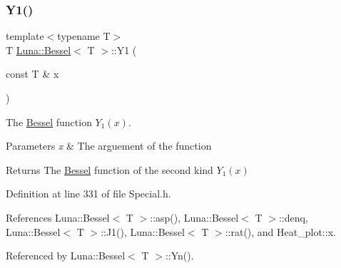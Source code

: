 \subsubsection{\texorpdfstring{Y1()}{Y1()}}
{\footnotesize\ttfamily template$<$typename T$>$ \\
T \hyperlink{structLuna_1_1Bessel}{Luna\+::\+Bessel}$<$ T $>$\+::Y1 (\begin{DoxyParamCaption}\item[{const T \&}]{x }\end{DoxyParamCaption})\hspace{0.3cm}{\ttfamily [inline]}}



The \hyperlink{structLuna_1_1Bessel}{Bessel} function $ Y_1(x) $. 


\begin{DoxyParams}{Parameters}
{\em x} & The arguement of the function \\
\hline
\end{DoxyParams}
\begin{DoxyReturn}{Returns}
The \hyperlink{structLuna_1_1Bessel}{Bessel} function of the second kind $ Y_1(x) $ 
\end{DoxyReturn}


Definition at line 331 of file Special.\+h.



References Luna\+::\+Bessel$<$ T $>$\+::asp(), Luna\+::\+Bessel$<$ T $>$\+::denq, Luna\+::\+Bessel$<$ T $>$\+::\+J1(), Luna\+::\+Bessel$<$ T $>$\+::rat(), and Heat\+\_\+plot\+::x.



Referenced by Luna\+::\+Bessel$<$ T $>$\+::\+Yn().


